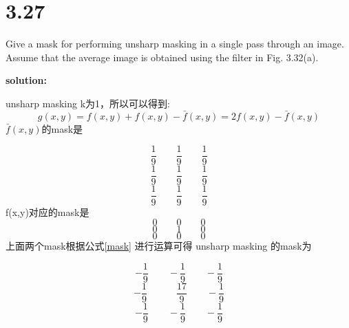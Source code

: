 \documentclass[UTF8,titlepage]{ctexart}
\begin{document}
\section*{3.27}
Give a mask for performing unsharp masking in a single pass through an
image. Assume that the average image is obtained using the filter in Fig. 3.32(a).

\noindent \textbf{solution:}

\noindent unsharp masking k为1，所以可以得到:
\begin{equation}
    g(x,y)=f(x,y)+f(x,y)-\bar{f}(x,y)=2f(x,y)-\bar{f}(x,y) \label{mask}
\end{equation}
$\bar{f}(x,y)$的mask是

$$\frac{1}{9}\qquad\frac{1}{9}\qquad\frac{1}{9}$$
$$\frac{1}{9}\qquad\frac{1}{9}\qquad\frac{1}{9}$$
$$\frac{1}{9}\qquad\frac{1}{9}\qquad\frac{1}{9}$$
f(x,y)对应的mask是
$$0\qquad0\qquad0$$
$$0\qquad1\qquad0$$
$$0\qquad0\qquad0$$
上面两个mask根据公式\eqref{mask} 进行运算可得 unsharp masking 的mask为

$$-\frac{1}{9}\qquad-\frac{1}{9}\qquad-\frac{1}{9}$$
$$-\frac{1}{9}\qquad\quad\frac{17}{9}\qquad-\frac{1}{9}$$
$$-\frac{1}{9}\qquad-\frac{1}{9}\qquad-\frac{1}{9}$$
\end{document}
